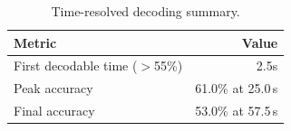 \begin{table}[H]
  \centering
  \caption{Time-resolved decoding summary.}
  \label{tab:temporal}
  \begin{tabular}{lr}
    \toprule
    Metric & Value \\
    \midrule
    First decodable time ($>$55\%) & 2.5s \\
    Peak accuracy & 61.0\% at 25.0\,s \\
    Final accuracy & 53.0\% at 57.5\,s \\
    \bottomrule
  \end{tabular}
\end{table}
